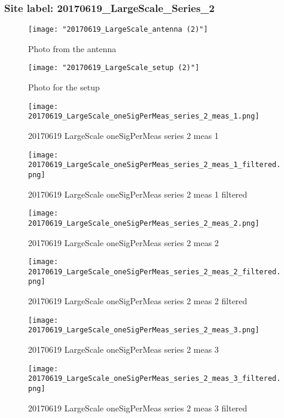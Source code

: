 \subsubsection{Site label: 20170619\_LargeScale\_Series\_2}
\begin{figure}[ht] \caption{Photo from the antenna}
\texttt{[image: "20170619\_LargeScale\_antenna (2)"]}\centering\end{figure}
\begin{figure}[ht] \caption{Photo for the setup}
\texttt{[image: "20170619\_LargeScale\_setup (2)"]}\centering\end{figure}
\begin{figure}[ht] \caption{20170619 LargeScale oneSigPerMeas series 2 meas 1}
\texttt{[image: 20170619\_LargeScale\_oneSigPerMeas\_series\_2\_meas\_1.png]}\centering\end{figure}
\begin{figure}[ht] \caption{20170619 LargeScale oneSigPerMeas series 2 meas 1 filtered}
\texttt{[image: 20170619\_LargeScale\_oneSigPerMeas\_series\_2\_meas\_1\_filtered.png]}\centering\end{figure}
\begin{figure}[ht] \caption{20170619 LargeScale oneSigPerMeas series 2 meas 2}
\texttt{[image: 20170619\_LargeScale\_oneSigPerMeas\_series\_2\_meas\_2.png]}\centering\end{figure}
\begin{figure}[ht] \caption{20170619 LargeScale oneSigPerMeas series 2 meas 2 filtered}
\texttt{[image: 20170619\_LargeScale\_oneSigPerMeas\_series\_2\_meas\_2\_filtered.png]}\centering\end{figure}
\begin{figure}[ht] \caption{20170619 LargeScale oneSigPerMeas series 2 meas 3}
\texttt{[image: 20170619\_LargeScale\_oneSigPerMeas\_series\_2\_meas\_3.png]}\centering\end{figure}
\begin{figure}[ht] \caption{20170619 LargeScale oneSigPerMeas series 2 meas 3 filtered}
\texttt{[image: 20170619\_LargeScale\_oneSigPerMeas\_series\_2\_meas\_3\_filtered.png]}\centering\end{figure}
\clearpage
